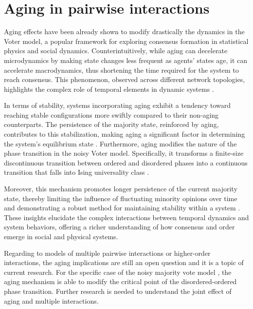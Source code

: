\section{\label{sec:Aging in pairwise interactions} Aging in pairwise interactions}

Aging effects have been already shown to modify drastically the dynamics in the Voter model, a popular framework for exploring consensus formation in statistical physics and social dynamics. Counterintuitively, while aging can decelerate microdynamics by making state changes less frequent as agents' states age, it can accelerate macrodynamics, thus shortening the time required for the system to reach consensus. This phenomenon, observed across different network topologies, highlights the complex role of temporal elements in dynamic systems \cite{Stark2008,fernandez-gracia-2011, perez-2016, perez-2016,boguna-2014}.

In terms of stability, systems incorporating aging exhibit a tendency toward reaching stable configurations more swiftly compared to their non-aging counterparts. The persistence of the majority state, reinforced by aging, contributes to this stabilization, making aging a significant factor in determining the system's equilibrium state \cite{peralta-2020}. Furthermore, aging modifies the nature of the phase transition in the noisy Voter model. Specifically, it transforms a finite-size discontinuous transition between ordered and disordered phases into a continuous transition that falls into Ising universality class \cite{artime-2018}.

Moreover, this mechanism promotes longer persistence of the current majority state, thereby limiting the influence of fluctuating minority opinions over time and demonstrating a robust method for maintaining stability within a system \cite{peralta-2020}. These insights elucidate the complex interactions between temporal dynamics and system behaviors, offering a richer understanding of how consensus and order emerge in social and physical systems.

Regarding to models of multiple pairwise interactions or higher-order interactions, the aging implications are still an open question and it is a topic of current research. For the specific case of the noisy majority vote model \cite{chen-2020}, the aging mechanism is able to modify the critical point of the disordered-ordered phase transition. Further research is needed to understand the joint effect of aging and multiple interactions.